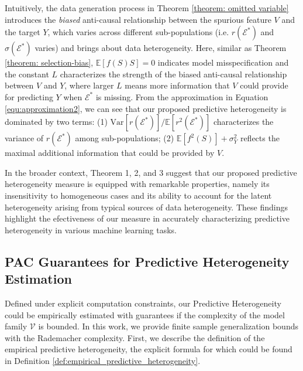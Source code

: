 Intuitively, the data generation process in Theorem \ref{theorem: omitted variable} introduces the \emph{biased} anti-causal relationship between the spurious feature $V$ and the target $Y$, which varies across different sub-populations (i.e. $r(\mathcal E^*)$ and $\sigma(\mathcal E^*)$ varies) and brings about data heterogeneity.
Here, similar as Theorem \ref{theorem: selection-bias}, $\mathbb{E}[f(S)S]=0$ indicates model misspecification and the constant $L$ characterizes the strength of the biased anti-causal relationship between $V$ and $Y$, where larger $L$ means more information that $V$ could provide for predicting $Y$ when $\mathcal E^*$ is missing.
From the approximation in Equation \ref{equ:approximation2}, we can see that our proposed predictive heterogeneity is dominated by two terms: (1) $\text{Var}[r(\mathcal E^*)]/\mathbb{E}[r^2(\mathcal E^*)]$ characterizes the variance of $r(\mathcal E^*)$ among sub-populations; (2) $\mathbb{E}[f^2(S)]+\sigma_Y^2$ reflects the maximal additional information that could be provided by $V$.

In the broader context, Theorem 1, 2, and 3 suggest that our proposed predictive heterogeneity measure is equipped with remarkable properties, namely its insensitivity to homogeneous cases and its ability to account for the latent heterogeneity arising from typical sources of data heterogeneity. 
These findings highlight the efectiveness of our measure in accurately characterizing predictive heterogeneity in various machine learning tasks.



\subsection{PAC Guarantees for Predictive Heterogeneity Estimation}
Defined under explicit computation constraints, our Predictive Heterogeneity could be empirically estimated with guarantees if the complexity of the model family $\mathcal V$ is bounded.
In this work, we provide finite sample generalization bounds with the Rademacher complexity. First, we describe the definition of the empirical predictive heterogeneity, the explicit formula for which could be found in Definition \ref{def:empirical_predictive_heterogeneity}.

